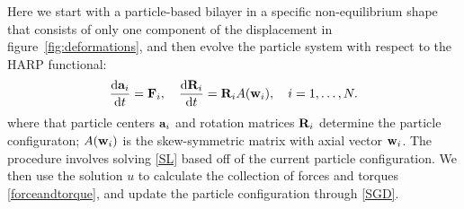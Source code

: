 %

Here we start with a particle-based bilayer in a specific non-equilibrium shape that consists of only one component of the displacement in figure~\ref{fig:deformations}, 
and then evolve the particle system
with respect to the HARP functional:
\begin{equation}
\label{SGD}   
\frac{\dif {\bf a}_i}{\dif t} = {\bf F}_i,    \quad  \frac{\dif {\bf R}_i}{\dif t}  = {\bf R}_i A({\bf w}_i),\quad i = 1, \dots, N.
\end{equation}
where that particle centers ${\bf a}_i$ and rotation matrices ${\bf R}_i$ determine the particle configuraton; 
$A({\bf w}_i)$ is the skew-symmetric matrix with axial vector ${\bf w}_i$.
The procedure involves solving \eqref{SL} based off of the current particle configuration.
We then use the solution $u$ to calculate the collection of forces and torques \eqref{forceandtorque}, and update the particle configuration
through \eqref{SGD}.

